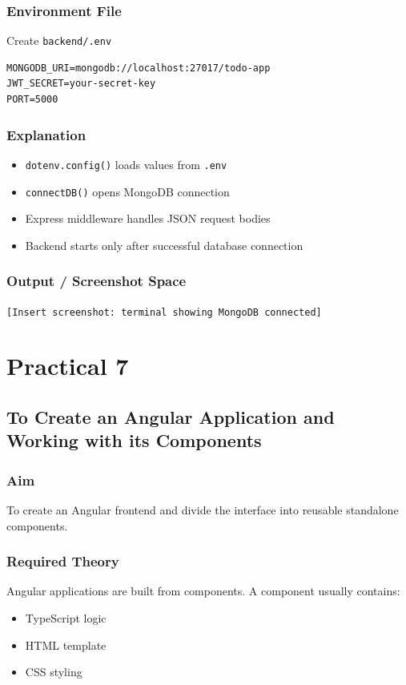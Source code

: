 \documentclass[12pt,a4paper]{article}
\begin{document}
\subsubsection*{Environment File}
Create \texttt{backend/.env}
\begin{lstlisting}[style=projectcode]
MONGODB_URI=mongodb://localhost:27017/todo-app
JWT_SECRET=your-secret-key
PORT=5000
\end{lstlisting}

\subsubsection*{Explanation}
\begin{itemize}
  \item \texttt{dotenv.config()} loads values from \texttt{.env}
  \item \texttt{connectDB()} opens MongoDB connection
  \item Express middleware handles JSON request bodies
  \item Backend starts only after successful database connection
\end{itemize}

\subsubsection*{Output / Screenshot Space}
\texttt{[Insert screenshot: terminal showing MongoDB connected]}

\section*{Practical 7}
\subsection*{To Create an Angular Application and Working with its Components}

\subsubsection*{Aim}
To create an Angular frontend and divide the interface into reusable standalone components.

\subsubsection*{Required Theory}
Angular applications are built from components. A component usually contains:
\begin{itemize}
  \item TypeScript logic
  \item HTML template
  \item CSS styling
\end{itemize}
\end{document}
